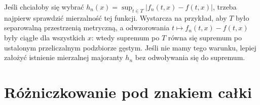 \begin{uwaga}
Jeśli chciałoby się wybrać $h_n(x)=\sup_{t\in T}|f_n(t,x)-f(t,x)|$,
trzeba najpierw sprawdzić mierzalność tej funkcji. Wystarcza
na przykład, aby $T$ było separowalną przestrzenią metryczną,
a odwzorowania $t\mapsto f_n(t,x)-f(t,x)$ były ciągłe dla
wszystkich $x$: wtedy supremum po $T$ równa się supremum
po ustalonym przeliczalnym podzbiorze gęstym. Jeśli nie
mamy tego warunku, lepiej założyć istnienie mierzalnej
majoranty $h_n$ bez odwoływania się do supremum.
\end{uwaga}

\section{Różniczkowanie pod znakiem całki}

